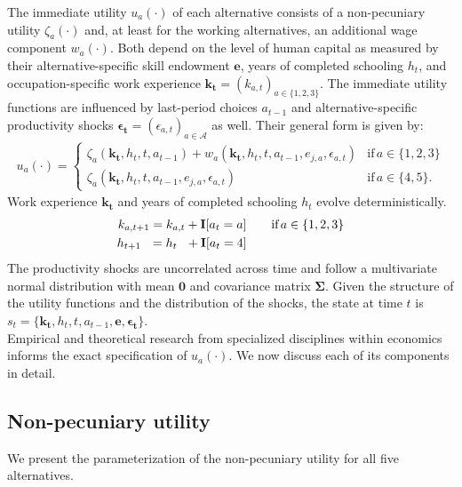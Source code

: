 \noindent The immediate utility $u_a(\cdot)$ of each alternative consists of a non-pecuniary utility $\zeta_a(\cdot)$ and, at least for the working alternatives, an additional wage component $w_a(\cdot)$. Both depend on the level of human capital as measured by their alternative-specific skill endowment $\bm{e}$, years of completed schooling $h_t$, and occupation-specific work experience $\bm{k_t} = \left(k_{a,t}\right)_{a\in\{1, 2, 3\}}$. The immediate utility functions are influenced by last-period choices $a_{t -1}$ and alternative-specific productivity shocks $\bm{\epsilon_t} = \left(\epsilon_{a,t}\right)_{a\in\mathcal{A}}$ as well. Their general form is given by:
%
\begin{align*}
u_a(\cdot) =
\begin{cases}
    \zeta_a(\bm{k_t}, h_t, t, a_{t -1})  + w_a(\bm{k_t}, h_t, t, a_{t -1}, e_{j, a}, \epsilon_{a,t})                & \text{if}\, a \in \{1, 2, 3\}  \\
    \zeta_a(\bm{k_t}, h_t, t, a_{t-1}, e_{j,a}, \epsilon_{a,t})                                                  &  \text{if}\, a \in \{4, 5\}.
\end{cases}
\end{align*}
%
Work experience $\bm{k_t}$  and years of completed schooling $h_t$ evolve deterministically.
%
\begin{align*}
k_{a,t+1} = k_{a,t} + {\textbf{I}}[a_t = a]  &\qquad \text{if}\, a \in \{1, 2, 3\} \\
h_{t + 1\phantom{,a}} = h_{t\phantom{,a}} +   {\textbf{I}}[a_t = 4]  &\qquad
\end{align*}
%
\noindent The productivity shocks are uncorrelated across time and follow a multivariate normal distribution with mean $\bm{0}$ and covariance matrix $\bm{\Sigma}$. Given the structure of the utility functions and the distribution of the shocks, the state at time $t$ is $s_t = \{\bm{k_t}, h_t, t, a_{t -1}, \bm{e},\bm{\epsilon_t}\}$.\\

\noindent Empirical and theoretical research from specialized disciplines within economics informs the exact specification of $u_a(\cdot)$. We now discuss each of its components in detail.
\subsection{Non-pecuniary utility}
We present the parameterization of the non-pecuniary utility for all five alternatives.
